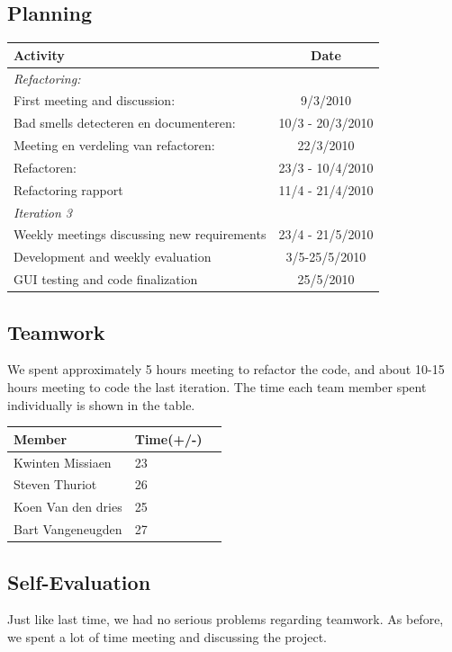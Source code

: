 			\subsection{Planning}
			\begin{tabular}{p{200 pt}|c}

			Activity & Date\\
			\hline
			\multicolumn{2}{l}{\emph{Refactoring:}} \\
			\hline
			First meeting and discussion: & 9/3/2010 \\
			\hline
			Bad smells detecteren en documenteren: & 10/3 - 20/3/2010	\\
			\hline
			Meeting en verdeling van refactoren: & 22/3/2010\\
			\hline
			Refactoren: & 23/3 - 10/4/2010\\
			\hline
			Refactoring rapport & 11/4 - 21/4/2010\\\hline
			\multicolumn{2}{l}{\emph{Iteration 3}} \\ \hline
			Weekly meetings discussing new requirements & 23/4 - 21/5/2010\\\hline
			Development and weekly evaluation & 3/5-25/5/2010 \\\hline
			GUI testing and code finalization & 25/5/2010\\ \hline
			\end{tabular}

			\subsection{Teamwork}
			We spent approximately 5 hours meeting to refactor the code, and about 10-15 hours meeting to code the last iteration. The time each team member spent individually is shown in the table.
			 
			\begin{tabular}{l|l|l}
			Member & Time(+/-) \\ \hline
			Kwinten Missiaen & 23 \\
			Steven Thuriot & 26 \\
			Koen Van den dries  & 25 \\
			Bart Vangeneugden & 27 \\
			\end{tabular}
			
			\subsection{Self-Evaluation}
			Just like last time, we had no serious problems regarding teamwork. As before, we spent a lot of time meeting and discussing the project.


